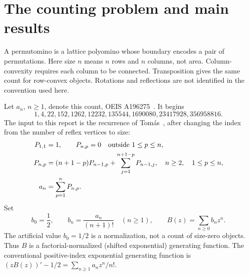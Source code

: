 \documentclass[11pt,letterpaper]{article}
\theoremstyle{remark}\newtheorem{remark}[theorem]{Remark}
\begin{document}
\section{The counting problem and main results}
A permutomino is a lattice polyomino whose boundary encodes a pair of permutations. Here size $n$ means $n$ rows and $n$ columns, not area. Column-convexity requires each column to be connected. Transposition gives the same count for row-convex objects. Rotations and reflections are not identified in the convention used here.

Let $a_n$, $n\ge1$, denote this count, OEIS A196275~\cite{oeis}. It begins
\[
1,4,22,152,1262,12232,135544,1690080,23417928,356958816.
\]
The input to this report is the recurrence of Tom\'as~\cite[Section 5.2]{tomas}, after changing the index from the number of reflex vertices to size:
\begin{align}
P_{1,1}&=1,\qquad P_{n,p}=0\quad\hbox{outside }1\le p\le n,\label{ccp:eq:init}\\
P_{n,p}&=(n+1-p)P_{n-1,p}+\sum_{j=1}^{n+1-p}P_{n-1,j},
 \quad n\ge2,\quad1\le p\le n,\label{ccp:eq:triangle}\\
a_n&=\sum_{p=1}^nP_{n,p}.\label{ccp:eq:sum}
\end{align}
Set
\begin{equation}
b_0=\frac12,\qquad b_n=\frac{a_n}{(n+1)!}\quad(n\ge1),
\qquad B(z)=\sum_{n\ge0}b_nz^n.\label{ccp:eq:bn}
\end{equation}
The artificial value $b_0=1/2$ is a normalization, not a count of size-zero objects. Thus $B$ is a factorial-normalized (shifted exponential) generating function. The conventional positive-index exponential generating function is $(zB(z))' -1/2=\sum_{n\ge1}a_nz^n/n!$.
\end{document}
